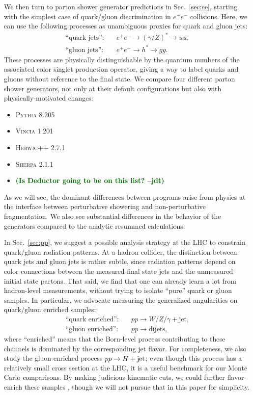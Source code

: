 \documentclass[11pt,letterpaper]{article}
\DeclareRobustCommand{\Sec}[1]{Sec.~\ref{#1}}
\newcommand{\jdt}[1]{\textbf{\textcolor{darkgreen}{(#1 --jdt)}}}
\begin{document}
We then turn to parton shower generator predictions in \Sec{sec:ee}, starting with the simplest case of quark/gluon discrimination in $e^+e^-$ collisions.  Here, we can use the following processes as unambiguous proxies for quark and gluon jets:
\begin{align}
\text{``quark jets''}: \quad & e^+e^- \to (\gamma/Z)^* \to u \overline{u}, \\
\text{``gluon jets''}: \quad & e^+e^- \to h^* \to g g.
\end{align}
These processes are physically distinguishable by the quantum numbers of the associated color singlet production operator, giving a way to label quarks and gluons without reference to the final state.  We compare four different parton shower generators, not only at their default configurations but also with physically-motivated changes:
\begin{itemize}
\item \textsc{Pythia 8.205} \cite{}
\item \textsc{Vincia 1.201} \cite{}
\item \textsc{Herwig++ 2.7.1} \cite{}
\item \textsc{Sherpa 2.1.1} \cite{}
\item \jdt{Is Deductor going to be on this list?}
\end{itemize}
As we will see, the dominant differences between programs arise from physics at the interface between perturbative showering and non-perturbative fragmentation.  We also see substantial differences in the behavior of the generators compared to the analytic resummed calculations.  

In \Sec{sec:pp}, we suggest a possible analysis strategy at the LHC to constrain quark/gluon radiation patterns.  At a hadron collider, the distinction between quark jets and gluon jets is rather subtle, since radiation patterns depend on color connections between the measured final state jets and the unmeasured initial state partons.  That said, we find that one can already learn a lot from hadron-level measurements, without trying to isolate ``pure'' quark or gluon samples.  In particular, we advocate measuring the generalized angularities on quark/gluon enriched samples:
\begin{align}
\text{``quark enriched''}: \quad & pp \to W/Z/\gamma + \text{jet}, \\
\text{``gluon enriched''}: \quad & pp \to \text{dijets},
\end{align}
where ``enriched'' means that the Born-level process contributing to these channels is dominated by the corresponding jet flavor.  For completeness, we also study the gluon-enriched process $pp \to H + \rm{jet}$; even though this process has a relatively small cross section at the LHC, it is a useful benchmark for our Monte Carlo comparisons.  By making judicious kinematic cuts, we could further flavor-enrich these samples \cite{}, though we will not pursue that in this paper for simplicity.
\end{document}
